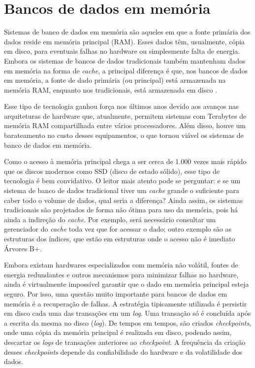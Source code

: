 \section{Bancos de dados em memória}
\label{sec:memoria}

Sistemas de banco de dados em memória são aqueles em que a fonte primária dos dados reside 
em memória principal (RAM). Esses dados têm, usualmente, cópia em disco, para eventuais falhas 
no hardware ou simplesmente falta de energia. Embora os sistemas de bancos de dados tradicionais 
também mantenham dados em memória na forma de \textit{cache}, a principal diferença é 
que, nos bancos de dados em memória, a fonte de dado primária (ou principal) está 
armazenada na memória RAM, enquanto nos tradicionais, está armazenada em disco 
\citep{garcia1992main, dewitt1984implementation}.

Esse tipo de tecnologia ganhou força nos últimos anos devido aos avanços nas arquiteturas de 
hardware que, atualmente, permitem sistemas com Terabytes de memória RAM compartilhada entre 
vários processadores. Além disso, houve um barateamento no custo desses equipamentos, o 
que tornou viável os sistemas de banco de dados em memória. 

Como o acesso à memória principal chega a ser cerca de 1.000 vezes mais rápido que os discos modernos 
como SSD (disco de estado sólido), esse tipo de tecnologia é bem convidativo. O leitor mais atento 
pode se perguntar: e se um sistema de banco de dados tradicional tiver um \textit{cache} grande o 
suficiente para caber todo o volume de dados, qual seria a diferença? Ainda assim, os sistemas tradicionais são 
projetados de forma não ótima para uso da memória, pois há ainda a indireção do \textit{cache}. 
Por exemplo, será necessário consultar um gerenciador do \textit{cache} toda vez que for acessar o dado;
outro exemplo são as estruturas dos índices, que estão em estruturas onde o acesso não é imediato Árvores B+. 

Embora existam hardwares especializados com memória não volátil, fontes de energia redundantes e 
outros mecanismos para minimizar falhas no hardware, ainda é virtualmente impossível garantir que o 
dado em memória principal esteja seguro. Por isso, uma questão muito importante para bancos de dados 
em memória é a recuperação de falhas. A estratégia tipicamente utilizada 
é persistir em disco cada uma das transações em um \textit{log}. Uma transação só é concluída após a 
escrita da mesma no disco (\textit{log}). De tempos em tempos, são criados \textit{checkpoints}, onde 
uma cópia da memória principal é realizada em disco, podendo assim, descartar os \textit{logs} de transações 
anteriores ao \textit{checkpoint}. A frequência da criação desses \textit{checkpoints} depende da 
confiabilidade do hardware e da volatilidade dos dados.

